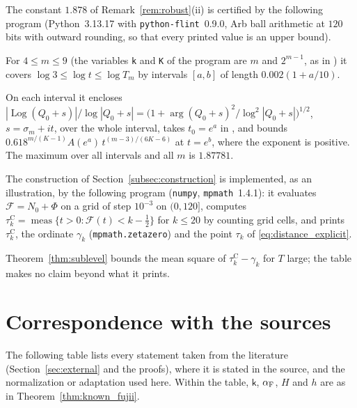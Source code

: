 \documentclass[11pt,a4paper]{article}
\makeatletter
\numberwithin{equation}{section}
\DeclareRobustCommand{\CGref}[1]{\ref{#1}}
\DeclareRobustCommand{\CGeqref}[1]{\eqref{#1}}
\DeclareRobustCommand{\CGcite}[2][]{\if\relax\detokenize{#1}\relax\cite{#2}\else\cite[#1]{#2}\fi}
\let\CG@origref\ref
\let\CG@origeqref\eqref
\newcommand{\CG@gettip}[1]{\@ifundefined{CGTip@#1}{#1}{\csname CGTip@#1\endcsname}}
\newcommand{\CG@getbib}[1]{\@ifundefined{CGBib@#1}{#1}{\csname CGBib@#1\endcsname}}
\DeclareRobustCommand{\CGref}[1]{\pdftooltip{\CG@origref{#1}}{\CG@gettip{#1}}}
\DeclareRobustCommand{\CGeqref}[1]{\pdftooltip{\CG@origeqref{#1}}{\CG@gettip{#1}}}
\DeclareRobustCommand{\CGcite}[2][]{\pdftooltip{\if\relax\detokenize{#1}\relax\cite{#2}\else\cite[#1]{#2}\fi}{\CG@getbib{#2}}}
\theoremstyle{definition}
\theoremstyle{remark}
\newcommand{\Nz}{N_0} %
\newcommand{\Fc}{\mathcal F}
\newcommand{\Ph}{\Phi}
\newcommand{\meas}{\operatorname{meas}}
\makeatother
\begin{document}




The constant $1.878$ of Remark~\CGref{rem:robust}(ii) is certified by the following program (Python~3.13.17 with \texttt{python-flint}~0.9.0, Arb ball arithmetic at $120$ bits with outward rounding, so that every printed value is an upper bound).

For $4\le m\le9$ (the variables \texttt{k} and \texttt{K} of the program are $m$ and $2^{m-1}$, as in \CGcite[\S3]{Yang2024}) it covers $\log3\le\log t\le\log T_m$ by intervals $[a,b]$ of length $0.002(1+a/10)$.

On each interval it encloses $|\operatorname{Log}(Q_0+s)|/\log|Q_0+s|=\bigl(1+\arg(Q_0+s)^2/\log^2|Q_0+s|\bigr)^{1/2}$, $s=\sigma_m+it$, over the whole interval, takes $t_0=e^a$ in \CGcite[(3.12)]{Yang2024}, and bounds $0.618^{m/(K-1)}A(e^a)\,t^{(m-3)/(6K-6)}$ at $t=e^b$, where the exponent is positive. The maximum over all intervals and all $m$ is $1.87781$.





The construction of Section~\CGref{subsec:construction} is implemented, as an illustration, by the following program (\texttt{numpy}, \texttt{mpmath}~1.4.1): it evaluates $\Fc=\Nz+\Ph$ on a grid of step $10^{-3}$ on $(0,120]$, computes $\tau_{k}^{\mathrm C}=\meas\{t>0:\Fc(t)<k-\frac12\}$ for $k\le20$ by counting grid cells, and prints $\tau_{k}^{\mathrm C}$, the ordinate $\gamma_k$ (\texttt{mpmath.zetazero}) and the point $\tau_k$ of \CGeqref{eq:distance_explicit}.

Theorem~\CGref{thm:sublevel} bounds the mean square of $\tau_{k}^{\mathrm C}-\gamma_k$ for $T$ large; the table makes no claim beyond what it prints.





\section{Correspondence with the sources}\label{app:sources}
The following table lists every statement taken from the literature (Section~\CGref{sec:external} and the proofs), where it is stated in the source, and the normalization or adaptation used here. Within the table, $\mathsf k$, $\alpha_{\rm F}$, $H$ and $h$ are as in Theorem~\CGref{thm:known_fujii}.
\end{document}
